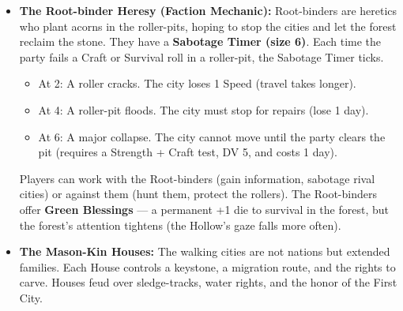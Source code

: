 \begin{itemize}
\begin{itemize}
    \item At 6: The city enters a narrow pass. All navigation rolls are Desperate.
    \item At 8: The city approaches a sacred site. The ancestors grow restless --- all rolls involving the Keystone gain +1 die, but failure ticks the Ancestor's Attention timer by 2.
    \item At 10: The city reaches its destination --- the end of the migration. The ancestors are satisfied. The party may claim a \textbf{Keystone Blessing} (a permanent +1 die to all rolls involving stonework or negotiation with Ngomebe).
  \end{itemize}
  The party can influence the Migration Timer by:
  \begin{itemize}
    \item \textbf{Scouting ahead} (Wits + Survival) --- success advances the timer by 1, failure ticks it back by 1.
    \item \textbf{Repairing rollers} (Craft test) --- success advances the timer by 2, failure advances it by 0 but ticks the Ancestor's Attention.
    \item \textbf{Paying tribute} (a Honey Jar, a story, or a Boon) --- advances the timer by 1 without risk.
  \end{itemize}
\item \textbf{The Root-binder Heresy (Faction Mechanic):} Root-binders are heretics who plant acorns in the roller-pits, hoping to stop the cities and let the forest reclaim the stone. They have a \textbf{Sabotage Timer (size 6)}. Each time the party fails a Craft or Survival roll in a roller-pit, the Sabotage Timer ticks.
  \begin{itemize}
    \item At 2: A roller cracks. The city loses 1 Speed (travel takes longer).
    \item At 4: A roller-pit floods. The city must stop for repairs (lose 1 day).
    \item At 6: A major collapse. The city cannot move until the party clears the pit (requires a Strength + Craft test, DV 5, and costs 1 day).
  \end{itemize}
  Players can work with the Root-binders (gain information, sabotage rival cities) or against them (hunt them, protect the rollers). The Root-binders offer \textbf{Green Blessings} --- a permanent +1 die to survival in the forest, but the forest's attention tightens (the Hollow's gaze falls more often).
\item \textbf{The Mason-Kin Houses:} The walking cities are not nations but extended families. Each House controls a keystone, a migration route, and the rights to carve. Houses feud over sledge-tracks, water rights, and the honor of the First City.

\end{itemize}
